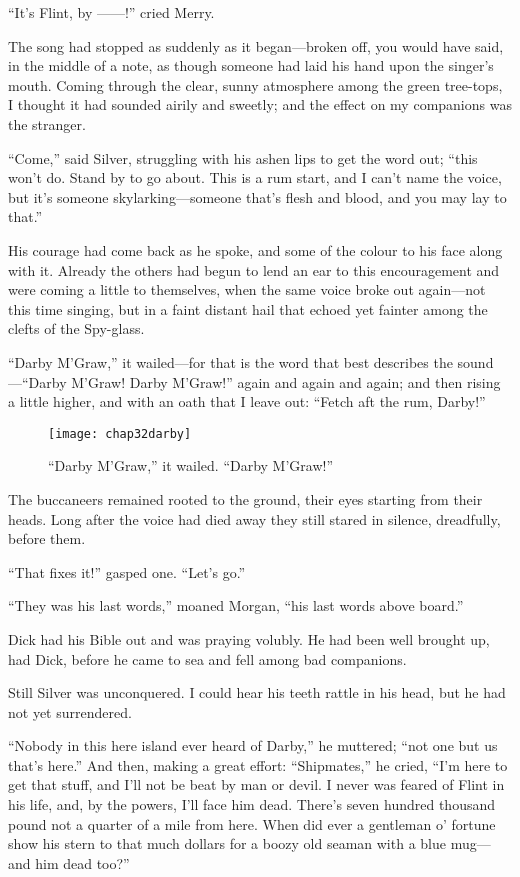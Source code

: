 \enquote{It’s Flint, by ------!} cried Merry.

The song had stopped as suddenly as it began---broken off, you would have said, in the middle of a note, as though someone had laid his hand upon the singer’s mouth. Coming through the clear, sunny atmosphere among the green tree-tops, I thought it had sounded airily and sweetly; and the effect on my companions was the stranger.

\enquote{Come,} said Silver, struggling with his ashen lips to get the word out; \enquote{this won’t do. Stand by to go about. This is a rum start, and I can’t name the voice, but it’s someone skylarking---someone that’s flesh and blood, and you may lay to that.}

His courage had come back as he spoke, and some of the colour to his face along with it. Already the others had begun to lend an ear to this encouragement and were coming a little to themselves, when the same voice broke out again---not this time singing, but in a faint distant hail that echoed yet fainter among the clefts of the Spy-glass.

\enquote{Darby M’Graw,} it wailed---for that is the word that best describes the sound---\enquote{Darby M’Graw! Darby M’Graw!} again and again and again; and then rising a little higher, and with an oath that I leave out: \enquote{Fetch aft the rum, Darby!}

 \begin{figure}[p]
\centering
\texttt{[image: chap32darby]}
\caption{\enquote{Darby M’Graw,} it wailed. \enquote{Darby M’Graw!}}
\end{figure}  

The buccaneers remained rooted to the ground, their eyes starting from their heads. Long after the voice had died away they still stared in silence, dreadfully, before them.

\enquote{That fixes it!} gasped one. \enquote{Let’s go.}

\enquote{They was his last words,} moaned Morgan, \enquote{his last words above board.}

Dick had his Bible out and was praying volubly. He had been well brought up, had Dick, before he came to sea and fell among bad companions.

Still Silver was unconquered. I could hear his teeth rattle in his head, but he had not yet surrendered.

\enquote{Nobody in this here island ever heard of Darby,} he muttered; \enquote{not one but us that’s here.} And then, making a great effort: \enquote{Shipmates,} he cried, \enquote{I’m here to get that stuff, and I’ll not be beat by man or devil. I never was feared of Flint in his life, and, by the powers, I’ll face him dead. There’s seven hundred thousand pound not a quarter of a mile from here. When did ever a gentleman o’ fortune show his stern to that much dollars for a boozy old seaman with a blue mug---and him dead too?}

